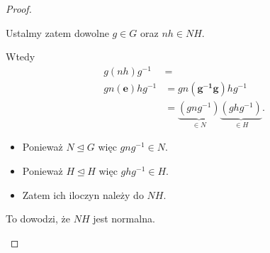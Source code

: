 \begin{proof}
\begin{enumerate}
			Ustalmy zatem dowolne $g\in G$ oraz $nh \in NH$. 

			Wtedy
			\begin{align*}
				g\left( nh \right) g^{-1} &= \\
				gn\left( \bm{e} \right) hg^{-1} &= gn\left( \bm{g^{-1}g} \right) hg^{-1} \\
										&= \underbrace{\left( gng^{-1} \right)}_{\in N} \underbrace{\left( ghg^{-1} \right)}_{\in H} 
			.\end{align*}
			\begin{itemize}
				\item Ponieważ $N\unlhd G$ więc $gng^{-1}\in N$.
				\item Ponieważ $H\unlhd H$ więc $ghg^{-1}\in H$.
				\item Zatem ich iloczyn należy do $NH$.
			\end{itemize}
			To dowodzi, że $NH$ jest normalna.
	\end{enumerate}
\end{proof}
